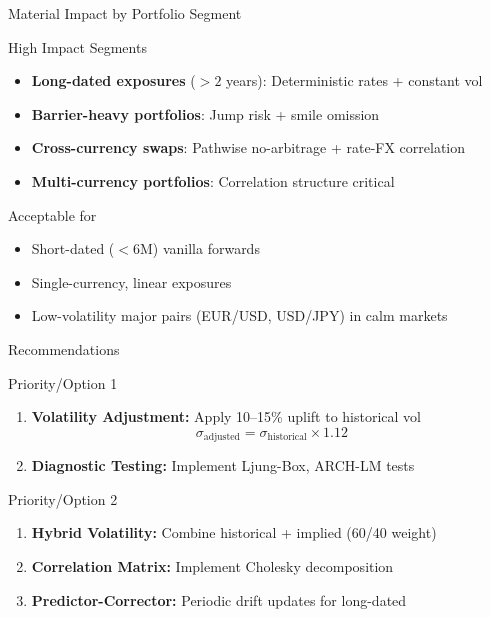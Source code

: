 \documentclass[11pt,aspectratio=169]{beamer}
\begin{document}
	\begin{frame}{Material Impact by Portfolio Segment}
		\begin{block}{High Impact Segments}
			\begin{itemize}
				\item \textcolor{mufgred}{\textbf{Long-dated exposures}} ($>2$ years): Deterministic rates + constant vol
				\item \textcolor{mufgred}{\textbf{Barrier-heavy portfolios}}: Jump risk + smile omission
				\item \textcolor{mufgred}{\textbf{Cross-currency swaps}}: Pathwise no-arbitrage + rate-FX correlation
				\item \textcolor{mufgred}{\textbf{Multi-currency portfolios}}: Correlation structure critical
			\end{itemize}
		\end{block}
		
		\vspace{0.3cm}
		
		\begin{block}{Acceptable for}
			\begin{itemize}
				\item Short-dated ($<6$M) vanilla forwards
				\item Single-currency, linear exposures
				\item Low-volatility major pairs (EUR/USD, USD/JPY) in calm markets
			\end{itemize}
		\end{block}
	\end{frame}
	
	\begin{frame}{Recommendations}
		\begin{block}{Priority/Option 1}
			\begin{enumerate}
				\item \textbf{Volatility Adjustment:} Apply 10--15\% uplift to historical vol
				\begin{equation*}
					\sigma_{\text{adjusted}} = \sigma_{\text{historical}} \times 1.12
				\end{equation*}
				\item \textbf{Diagnostic Testing:} Implement Ljung-Box, ARCH-LM tests
 
			\end{enumerate}
		\end{block}
		
		\vspace{0.2cm}
		
		\begin{block}{Priority/Option 2 }
			\begin{enumerate}
				\item \textbf{Hybrid Volatility:} Combine historical + implied (60/40 weight)
				\item \textbf{Correlation Matrix:} Implement Cholesky decomposition
				\item \textbf{Predictor-Corrector:} Periodic drift updates for long-dated
			\end{enumerate}
		\end{block}
	\end{frame}
	
\end{document}
